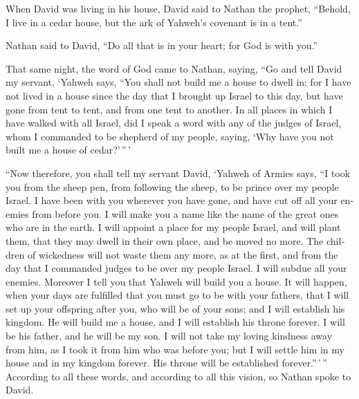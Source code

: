 \begin{paracol}{2}
\begin{otherlanguage}{english}
 When David was living in his house, David said to Nathan
the prophet, ``Behold, I live in a cedar house, but the ark of Yahweh's
covenant is in a tent.''

 Nathan said to David, ``Do all that is in your heart; for
God is with you.''

 That same night, the word of God came to Nathan, saying,
 ``Go and tell David my servant, `Yahweh says, ``You shall
not build me a house to dwell in;  for I have not lived in
a house since the day that I brought up Israel to this day, but have
gone from tent to tent, and from one tent to another.  In
all places in which I have walked with all Israel, did I speak a word
with any of the judges of Israel, whom I commanded to be shepherd of my
people, saying, `Why have you not built me a house of cedar?'\,''\,'

 ``Now therefore, you shall tell my servant David, `Yahweh
of Armies says, ``I took you from the sheep pen, from following the
sheep, to be prince over my people Israel.  I have been
with you wherever you have gone, and have cut off all your enemies from
before you. I will make you a name like the name of the great ones who
are in the earth.  I will appoint a place for my people
Israel, and will plant them, that they may dwell in their own place, and
be moved no more. The children of wickedness will not waste them any
more, as at the first,  and from the day that I commanded
judges to be over my people Israel. I will subdue all your enemies.
Moreover I tell you that Yahweh will build you a house. 
It will happen, when your days are fulfilled that you must go to be with
your fathers, that I will set up your offspring after you, who will be
of your sons; and I will establish his kingdom.  He will
build me a house, and I will establish his throne forever.
 I will be his father, and he will be my son. I will not
take my loving kindness away from him, as I took it from him who was
before you;  but I will settle him in my house and in my
kingdom forever. His throne will be established forever.''\,'\,''
 According to all these words, and according to all this
vision, so Nathan spoke to David.


\end{otherlanguage}
\end{paracol}

